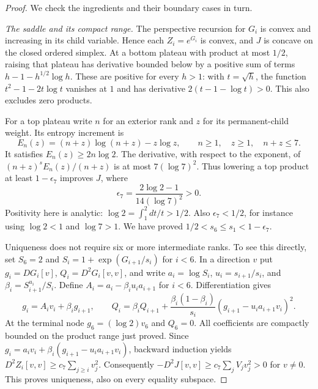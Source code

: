 \begin{proof}
We check the ingredients and their boundary cases in turn.

\emph{The saddle and its compact range.}
The perspective recursion for $G_i$ is convex and increasing in its
child variable. Hence each $Z_i=e^{G_i}$ is convex, and $J$ is concave
on the closed ordered simplex. At a bottom plateau with product at
most $1/2$, raising that plateau has derivative bounded below by a
positive sum of terms $h-1-h^{1/2}\log h$. These are positive for
every $h>1$: with $t=\sqrt h$, the function
$t^2-1-2t\log t$ vanishes at $1$ and has derivative
$2(t-1-\log t)>0$. This also excludes zero products.

For a top plateau write $n$ for an exterior rank and $z$ for its
permanent-child weight. Its entropy increment is
\[
 E_n(z)=(n+z)\log(n+z)-z\log z,
 \qquad n\geq1,\quad z\geq1,\quad n+z\leq7.
\]
It satisfies $E_n(z)\geq2n\log2$. The derivative, with respect to
the exponent, of $(n+z)^s E_n(z)/(n+z)$ is at most
$7(\log7)^2$. Thus lowering a top product at least
$1-\epsilon_7$ improves $J$, where
\begin{equation}
 \epsilon_7=\frac{2\log2-1}{14(\log7)^2}>0.
 \label{k6geom:epsilon}
\end{equation}
Positivity here is analytic: $\log2=\int_1^2dt/t>1/2$.
Also $\epsilon_7<1/2$, for instance using $\log2<1$ and
$\log7>1$. We have proved $1/2<s_6\leq s_1<1-\epsilon_7$.

Uniqueness does not require six or more intermediate ranks. To see
this directly, set $S_6=2$ and $S_i=1+\exp(G_{i+1}/s_i)$ for $i<6$.
In a direction $v$ put $g_i=DG_i[v]$,
$Q_i=D^2G_i[v,v]$, and write $a_i=\log S_i$,
$u_i=s_{i+1}/s_i$, and $\beta_i=S_{i+1}^{u_i}/S_i$. Define
$A_i=a_i-\beta_i u_i a_{i+1}$ for $i<6$. Differentiation
gives
\[
 g_i=A_iv_i+\beta_i g_{i+1},\qquad
 Q_i=\beta_iQ_{i+1}
   +\frac{\beta_i(1-\beta_i)}{s_i}
                 (g_{i+1}-u_i a_{i+1}v_i)^2.
\]
At the terminal node $g_6=(\log2)v_6$ and $Q_6=0$.
All coefficients are compactly bounded on the product range just
proved. Since $g_i=a_iv_i+\beta_i(g_{i+1}-u_i a_{i+1}v_i)$,
backward induction yields
$D^2Z_i[v,v]\geq c_7\sum_{j\geq i}v_j^2$.
Consequently $-D^2J[v,v]\geq c_7\sum_j V_jv_j^2>0$ for
$v\ne0$. This proves uniqueness, also on every equality subspace.


\end{proof}
